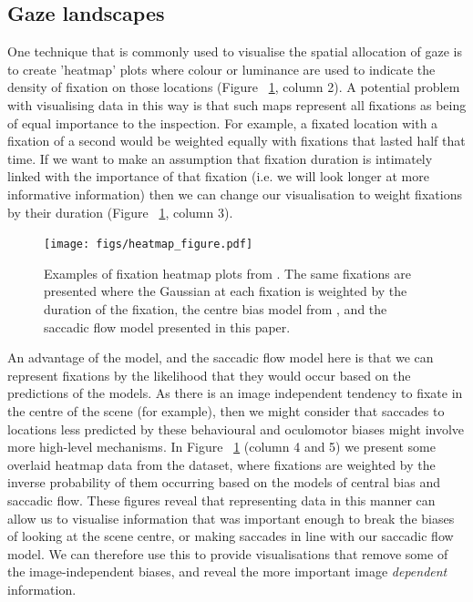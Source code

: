 \documentclass[a4paper, twocolumn, oneside, 10pt]{article}
\begin{document}
\subsection{Gaze landscapes}

One technique that is commonly used to visualise the spatial allocation of gaze is to create 'heatmap' plots where colour or luminance are used to indicate the density of fixation on those locations (Figure ~\ref{fig:adjustedHeatmaps}, column 2). A potential problem with visualising data in this way is that such maps represent all fixations as being of equal importance to the inspection. For example, a fixated location with a fixation of a second would be weighted equally with fixations that lasted half that time. If we want to make an assumption that fixation duration is intimately linked with the importance of that fixation (i.e. we will look longer at more informative information) then we can change our visualisation to weight fixations by their duration (Figure ~\ref{fig:adjustedHeatmaps}, column 3).

\begin{figure}
\centering
\texttt{[image: figs/heatmap\_figure.pdf]}
\caption{Examples of fixation heatmap plots from \cite{clarke2013}. The same fixations are presented where the Gaussian at each fixation is weighted by the duration of the fixation, the centre bias model from \citep{clarke-tatler2014} , and the saccadic flow model presented in this paper.}
\label{fig:adjustedHeatmaps}
\end{figure}

An advantage of the \citet{clarke-tatler2014} model, and the saccadic flow model here is that we can represent fixations by the likelihood that they would occur based on the predictions of the models. As there is an image independent tendency to fixate in the centre of the scene (for example), then we might consider that saccades to locations less predicted by these behavioural and oculomotor biases might involve more high-level mechanisms. In Figure ~\ref{fig:adjustedHeatmaps} (column 4 and 5) we present some overlaid heatmap data from the \citet{clarke2013} dataset, where fixations are weighted by the inverse probability of them occurring based on the models of central bias and saccadic flow. These figures reveal that representing data in this manner can allow us to visualise information that was important enough to break the biases of looking at the scene centre, or making saccades in line with our saccadic flow model. We can therefore use this to provide visualisations that remove some of the image-independent biases, and reveal the more important image \emph{dependent} information.
\end{document}
